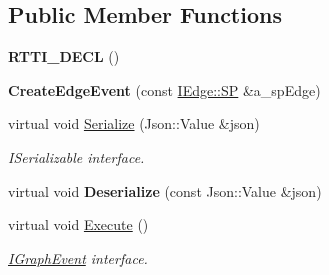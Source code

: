 \subsection*{Public Member Functions}
\begin{DoxyCompactItemize}
\item 
\mbox{\label{struct_graph_connector_1_1_create_edge_event_a59f09d87a73f150f34782a24cc93a46c}} 
{\bfseries R\+T\+T\+I\+\_\+\+D\+E\+CL} ()
\item 
\mbox{\label{struct_graph_connector_1_1_create_edge_event_a297a346ae3207e20e6cb387e5be03afc}} 
{\bfseries Create\+Edge\+Event} (const \hyperlink{class_i_graph_1_1_i_edge_adfae3ec3e377543685a06b9c5d5a776a}{I\+Edge\+::\+SP} \&a\+\_\+sp\+Edge)
\item 
\mbox{\label{struct_graph_connector_1_1_create_edge_event_a248fe9635c43e0e52988942b2dac210b}} 
virtual void \hyperlink{struct_graph_connector_1_1_create_edge_event_a248fe9635c43e0e52988942b2dac210b}{Serialize} (Json\+::\+Value \&json)
\begin{DoxyCompactList}\small\item\em I\+Serializable interface. \end{DoxyCompactList}\item 
\mbox{\label{struct_graph_connector_1_1_create_edge_event_a9c00b46a08f0b77e0119b549175d95e5}} 
virtual void {\bfseries Deserialize} (const Json\+::\+Value \&json)
\item 
\mbox{\label{struct_graph_connector_1_1_create_edge_event_a38ec62cdd25c5877f530123117a30cc7}} 
virtual void \hyperlink{struct_graph_connector_1_1_create_edge_event_a38ec62cdd25c5877f530123117a30cc7}{Execute} ()
\begin{DoxyCompactList}\small\item\em \hyperlink{struct_graph_connector_1_1_i_graph_event}{I\+Graph\+Event} interface. \end{DoxyCompactList}\end{DoxyCompactItemize}
